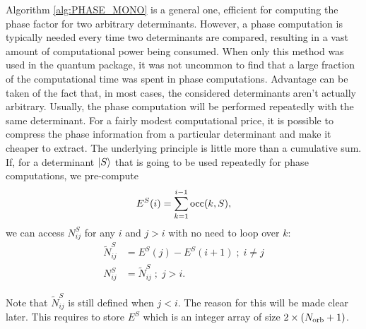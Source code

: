 \documentclass[./thesis.tex]{subfiles}
\begin{document}
Algorithm \ref{alg:PHASE_MONO} is a general one, efficient for computing the phase factor for two arbitrary determinants. However, a phase computation is typically needed every time two determinants are compared, resulting in a vast amount of computational power being consumed. When only this method was used in the quantum package, it was not uncommon to find that a large fraction of the computational time was spent in phase computations.
Advantage can be taken of the fact that, in most cases, the considered determinants aren't actually arbitrary. Usually, the phase computation will be performed repeatedly with the same determinant. For a fairly modest computational price, it is possible to compress the phase information from a particular determinant and make it cheaper to extract. The underlying principle is little more than a cumulative sum. If, for a determinant $\ket{S}$ that is going to be used repeatedly for phase computations, we pre-compute
\begin{equation}
E^S(i) = \sum_{k=1}^{i-1} {\text{occ}(k,S)},
\end{equation}
we can access $N^S_{ij}$ for any $i$ and $j>i$ with no need to loop over $k$:
\begin{align}
\tilde N^S_{ij} &= E^S(j) - E^S(i+1) \; ; \; i \neq j \\
N^S_{ij} &= \tilde N^S_{ij} \; ; \; j>i.
\end{align}

Note that $\tilde N^S_{ij}$ is still defined when $j<i$. The reason for this will be made clear later.
This requires to store $E^S$ which is an integer array of size $2 \times ({N_\text{orb}}+1)$. 




\end{document}
